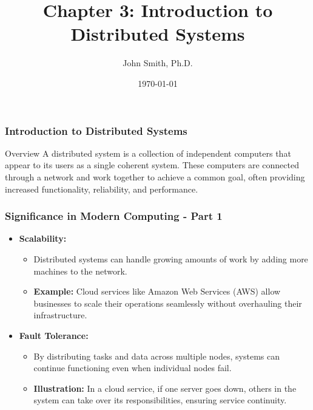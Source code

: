 \documentclass[aspectratio=169]{beamer}
\title[Distributed Systems]{Chapter 3: Introduction to Distributed Systems}
\author[J. Smith]{John Smith, Ph.D.}
\institute[University Name]{
  Department of Computer Science\\
  University Name\\
  \vspace{0.3cm}
  Email: email@university.edu\\
  Website: www.university.edu
}
\date{\today}
\begin{document}
\frame{\titlepage}

\begin{frame}[fragile]
    \frametitle{Introduction to Distributed Systems}
    \begin{block}{Overview}
        A distributed system is a collection of independent computers that appear to its users as a single coherent system. These computers are connected through a network and work together to achieve a common goal, often providing increased functionality, reliability, and performance.
    \end{block}
\end{frame}

\begin{frame}[fragile]
    \frametitle{Significance in Modern Computing - Part 1}
    \begin{itemize}
        \item \textbf{Scalability:}
        \begin{itemize}
            \item Distributed systems can handle growing amounts of work by adding more machines to the network.
            \item \textbf{Example:} Cloud services like Amazon Web Services (AWS) allow businesses to scale their operations seamlessly without overhauling their infrastructure.
        \end{itemize}
        
        \item \textbf{Fault Tolerance:}
        \begin{itemize}
            \item By distributing tasks and data across multiple nodes, systems can continue functioning even when individual nodes fail.
            \item \textbf{Illustration:} In a cloud service, if one server goes down, others in the system can take over its responsibilities, ensuring service continuity.
        \end{itemize}
    \end{itemize}
\end{frame}
\end{document}
